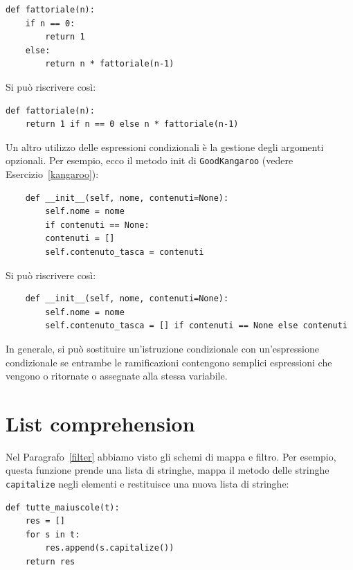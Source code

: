 \documentclass[10pt]{book}
\begin{document}
\begin{verbatim}
def fattoriale(n):
    if n == 0:
        return 1
    else:
        return n * fattoriale(n-1)
\end{verbatim}

Si può riscrivere così:

\begin{verbatim}
def fattoriale(n):
    return 1 if n == 0 else n * fattoriale(n-1)
\end{verbatim}

Un altro utilizzo delle espressioni condizionali è la gestione degli argomenti opzionali. Per esempio, ecco il metodo init di
{\tt GoodKangaroo} (vedere Esercizio~\ref{kangaroo}):

\begin{verbatim}
    def __init__(self, nome, contenuti=None):
        self.nome = nome
        if contenuti == None:
        contenuti = []
        self.contenuto_tasca = contenuti
\end{verbatim}

Si può riscrivere così:

\begin{verbatim}
    def __init__(self, nome, contenuti=None):
        self.nome = nome
        self.contenuto_tasca = [] if contenuti == None else contenuti 
\end{verbatim}

In generale, si può sostituire un'istruzione condizionale con un'espressione condizionale se entrambe le ramificazioni contengono semplici espressioni che vengono o ritornate o assegnate alla stessa variabile.



\section{List comprehension}

Nel Paragrafo~\ref{filter} abbiamo visto gli schemi di mappa e filtro. Per esempio, questa funzione prende una lista di stringhe, mappa il metodo delle stringhe {\tt capitalize} negli elementi e restituisce una nuova lista di stringhe:

\begin{verbatim}
def tutte_maiuscole(t):
    res = []
    for s in t:
        res.append(s.capitalize())
    return res
\end{verbatim}
\end{document}
